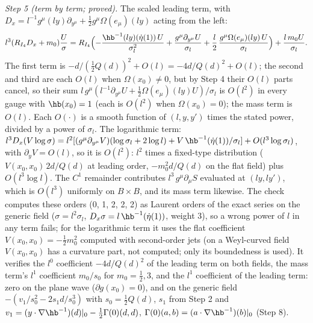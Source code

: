 \emph{Step 5 (term by term; proved).} The scaled leading term, with $D_{x} = l^{-1}g^{\mu}(ly)\partial_{y^{\mu}} + \tfrac12 g^{\mu}\Omega(e_{\mu})(ly)$ acting from the left:
\[
l^{3}(R_{I_{4}}D_{x} + m_{0})\frac{U}{\sigma} = R_{I_{4}}\Bigl(-\frac{\hb^{-1}(ly)(\dot\eta(1))\,U}{\sigma_{l}^{2}} + \frac{g^{\mu}\partial_{y^{\mu}}U}{\sigma_{l}} + \frac{l}{2}\,\frac{g^{\mu}\Omega(e_{\mu})(ly)\,U}{\sigma_{l}}\Bigr) + \frac{l\,m_{0}U}{\sigma_{l}} .
\]
The first term is $-d/(\tfrac12 Q(d))^{2} + O(l) = -4d/Q(d)^{2} + O(l)$; the second and third are each $O(l)$ when $\Omega(x_{0}) \ne 0$, but by Step 4 their $O(l)$ parts cancel, so their sum $l\,g^{\mu}(l^{-1}\partial_{y^{\mu}}U + \tfrac12\Omega(e_{\mu})(ly)U)/\sigma_{l}$ is $O(l^{2})$ in every gauge with $\hb(x_{0}) = 1$ (each is $O(l^{2})$ when $\Omega(x_{0}) = 0$); the mass term is $O(l)$. Each $O(\cdot)$ is a smooth function of $(l, y, y')$ times the stated power, divided by a power of $\sigma_{l}$. The logarithmic term: $l^{3}D_{x}(V\log\sigma) = l^{2}[(g^{\mu}\partial_{y^{\mu}}V)(\log\sigma_{l} + 2\log l) + V\,\hb^{-1}(\dot\eta(1))/\sigma_{l}] + O(l^{3}\log\sigma_{l})$, with $\partial_{y}V = O(l)$, so it is $O(l^{2})$: $l^{2}$ times a fixed-type distribution ($V(x_{0}, x_{0})\,2d/Q(d)$ at leading order, $-m_{0}^{2}d/Q(d)$ on the flat field) plus $O(l^{3}\log l)$. The $C^{1}$ remainder contributes $l^{3}\,g^{\mu}\partial_{\mu}S$ evaluated at $(ly, ly')$, which is $O(l^{3})$ uniformly on $B\times B$, and its mass term likewise. The check computes these orders (0, 1, 2, 2, 2) as Laurent orders of the exact series on the generic field ($\sigma = l^{2}\sigma_{l}$, $D_{x}\sigma = l\,\hb^{-1}(\dot\eta(1))$, weight $3$), so a wrong power of $l$ in any term fails; for the logarithmic term it uses the flat coefficient $V(x_{0}, x_{0}) = -\tfrac12 m_{0}^{2}$ computed with second-order jets (on a Weyl-curved field $V(x_{0}, x_{0})$ has a curvature part, not computed; only its boundedness is used). It verifies the $l^{0}$ coefficient $-4d/Q(d)^{2}$ of the leading term on both fields, the mass term's $l^{1}$ coefficient $m_{0}/s_{0}$ for $m_{0} = \tfrac12, 3$, and the $l^{1}$ coefficient of the leading term: zero on the plane wave ($\partial g(x_{0}) = 0$), and on the generic field $-(v_{1}/s_{0}^{2} - 2s_{1}d/s_{0}^{3})$ with $s_{0} = \tfrac12 Q(d)$, $s_{1}$ from Step 2 and $v_{1} = (y\cdot\nabla\hb^{-1})(d)|_{0} - \tfrac12\Gamma(0)(d, d)$, $\Gamma(0)(a, b) = (a\cdot\nabla\hb^{-1})(b)|_{0}$ (Step 8).

